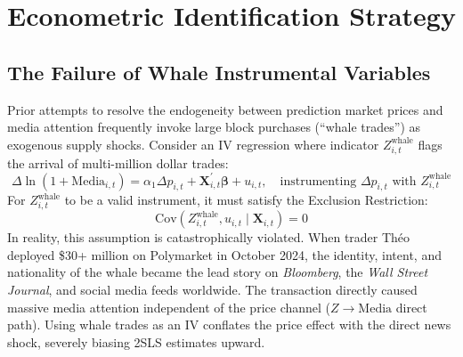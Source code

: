 \documentclass[12pt, a4paper]{article}
\begin{document}
\section{Econometric Identification Strategy}
\label{sec:identification}

\subsection{The Failure of Whale Instrumental Variables}
Prior attempts to resolve the endogeneity between prediction market prices and media attention frequently invoke large block purchases (``whale trades'') as exogenous supply shocks. Consider an IV regression where indicator $Z_{i,t}^{\text{whale}}$ flags the arrival of multi-million dollar trades:
\begin{equation}
\Delta \ln(1 + \text{Media}_{i,t}) = \alpha_1 \Delta p_{i,t} + \mathbf{X}_{i,t}^\prime \boldsymbol{\beta} + u_{i,t}, \quad \text{instrumenting } \Delta p_{i,t} \text{ with } Z_{i,t}^{\text{whale}}
\end{equation}
For $Z_{i,t}^{\text{whale}}$ to be a valid instrument, it must satisfy the Exclusion Restriction:
\begin{equation}
\text{Cov}(Z_{i,t}^{\text{whale}}, u_{i,t} \mid \mathbf{X}_{i,t}) = 0
\end{equation}
In reality, this assumption is catastrophically violated. When trader Th\'eo deployed \$30+ million on Polymarket in October 2024, the identity, intent, and nationality of the whale became the lead story on \textit{Bloomberg}, the \textit{Wall Street Journal}, and social media feeds worldwide. The transaction directly caused massive media attention independent of the price channel ($Z \to \text{Media}$ direct path). Using whale trades as an IV conflates the price effect with the direct news shock, severely biasing 2SLS estimates upward.
\end{document}
